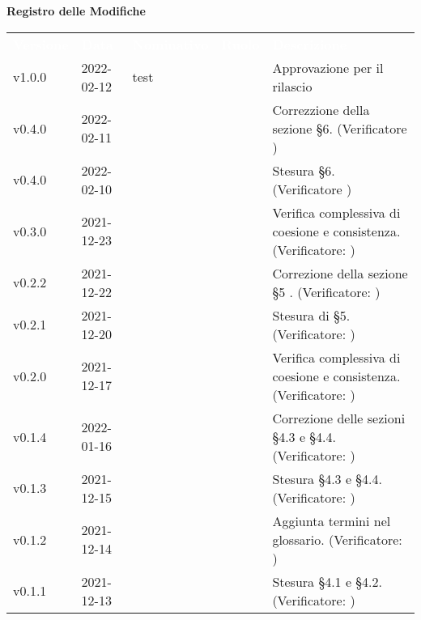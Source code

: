 
{\LARGE{\textbf{Registro delle Modifiche}}} \\
\renewcommand{\arraystretch}{1.5}
\begin{longtable}{ m{}<{\centering}  m{}<{\centering}  m{}<{\centering}  m{}<{\centering}  m{}<{\centering} }
	\rowcolor{darkblue}
	\textcolor{white}{\textbf{Versione}} &\textcolor{white}{\textbf{Data}}& \textcolor{white}{\textbf{Nominativo}} & \textcolor{white}{\textbf{Ruolo}}& \textcolor{white}{\textbf{Descrizione}} \\ 	
	v1.0.0& 2022-02-12 & test & \RE{}  & Approvazione per il rilascio\\

	v0.4.0& 2022-02-11 & \EP{} & \AM{} & Correzzione della sezione §6. (Verificatore \textit{\FP}) \\

	v0.4.0& 2022-02-10 & \EP{} & \AM{} & Stesura §6. (Verificatore \textit{\FP}) \\

	v0.3.0& 2021-12-23 & \EP{} & \VE{} & Verifica complessiva di coesione e consistenza. (Verificatore: \textit{\FP})\\	

	v0.2.2& 2021-12-22 & \EP{} & \AM{} & Correzione della sezione §5 . (Verificatore: \textit{\FP})\\
	
	v0.2.1& 2021-12-20 & \EP{} & \AM{} & Stesura di §5. (Verificatore: \textit{\FP})\\

	v0.2.0& 2021-12-17 & \EP{} & \VE{} & Verifica complessiva di coesione e consistenza. (Verificatore: \textit{\FP})\\	
	
	v0.1.4& 2022-01-16 & \MB{} & \AM{} & Correzione delle sezioni §4.3 e §4.4. (Verificatore: \textit{\FP})\\
	
	v0.1.3& 2021-12-15 & \MB{} & \AM{} & Stesura §4.3 e §4.4. (Verificatore: \textit{\FP})\\

	v0.1.2& 2021-12-14 & \EP{} & \RE{} & Aggiunta termini nel glossario. (Verificatore: \textit{\FP})\\

	v0.1.1& 2021-12-13 & \MB{} & \AM{} & Stesura §4.1 e §4.2. (Verificatore: \textit{\FP})\\


\end{longtable}
